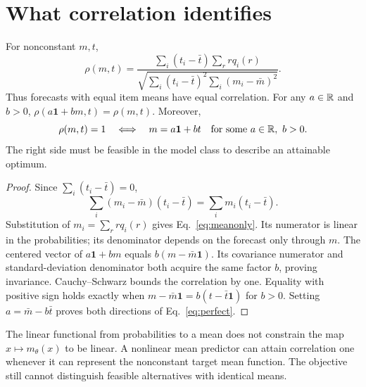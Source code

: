 \section{What correlation identifies}
\begin{proposition}\label{prop:invariance}
For nonconstant $m,t$,
\begin{equation}\label{eq:meanonly}
 \rho(m,t)=\frac{\sum_i(t_i-\bar t)\sum_r r q_i(r)}{\sqrt{\sum_i(t_i-\bar t)^2\sum_i(m_i-\bar m)^2}}.
\end{equation}
Thus forecasts with equal item means have equal correlation.
For any $a\in\mathbb{R}$ and $b>0$, $\rho(a\mathbf1+bm,t)=\rho(m,t)$.
Moreover,
\begin{equation}\label{eq:perfect}
 \rho(m,t)=1\quad\Longleftrightarrow\quad m=a\mathbf1+bt\quad\text{for some }a\in\mathbb{R},\ b>0.
\end{equation}
The right side must be feasible in the model class to describe an attainable optimum.
\end{proposition}
\begin{proof}
Since $\sum_i(t_i-\bar t)=0$,
\[
 \sum_i(m_i-\bar m)(t_i-\bar t)=\sum_i m_i(t_i-\bar t).
\]
Substitution of $m_i=\sum_r r q_i(r)$ gives Eq.~\eqref{eq:meanonly}.
Its numerator is linear in the probabilities; its denominator depends on the forecast only through $m$.
The centered vector of $a\mathbf1+bm$ equals $b(m-\bar m\mathbf1)$.
Its covariance numerator and standard-deviation denominator both acquire the same factor $b$, proving invariance.
Cauchy--Schwarz bounds the correlation by one.
Equality with positive sign holds exactly when $m-\bar m\mathbf1=b(t-\bar t\mathbf1)$ for $b>0$.
Setting $a=\bar m-b\bar t$ proves both directions of Eq.~\eqref{eq:perfect}.
\end{proof}

The linear functional from probabilities to a mean does not constrain the map $x\mapsto m_\theta(x)$ to be linear.
A nonlinear mean predictor can attain correlation one whenever it can represent the nonconstant target mean function.
The objective still cannot distinguish feasible alternatives with identical means.

